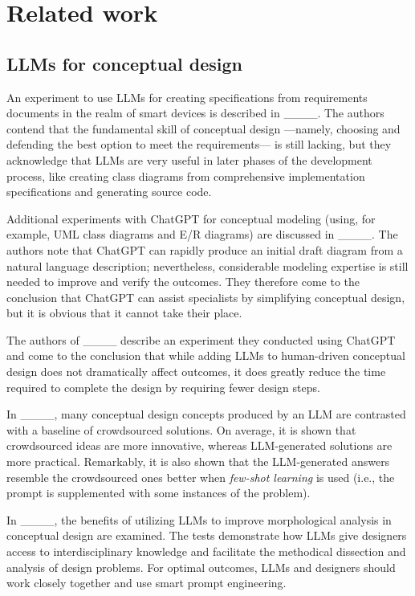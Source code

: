 \section{Related work}
\label{sec:rw}
\subsection{LLMs for conceptual design}

An experiment to use LLMs for creating specifications from requirements documents in the realm of smart devices is described in ____. The authors contend that the fundamental skill of conceptual design ---namely, choosing and defending the best option to meet the requirements--- is still lacking, but they acknowledge that LLMs are very useful in later phases of the development process, like creating class diagrams from comprehensive implementation specifications and generating source code. 

Additional experiments with ChatGPT for conceptual modeling (using, for example, UML class diagrams and E/R diagrams) are discussed in ____. 
The authors note that ChatGPT can rapidly produce an initial draft diagram from a natural language description; nevertheless, considerable modeling expertise is still needed to improve and verify the outcomes. They therefore come to the conclusion that ChatGPT can assist specialists by simplifying conceptual design, but it is obvious that it cannot take their place.

The authors of ____ describe an experiment they conducted using ChatGPT and come to the conclusion that while adding LLMs to human-driven conceptual design does not dramatically affect outcomes, it does greatly reduce the time required to complete the design by requiring fewer design steps.

In ____, many conceptual design concepts produced by an LLM are contrasted with a baseline of crowdsourced solutions. On average, it is shown that crowdsourced ideas are more innovative, whereas LLM-generated solutions are more practical. Remarkably, it is also shown that the LLM-generated answers resemble the crowdsourced ones better when \emph{few-shot learning} is used (i.e., the prompt is supplemented with some instances of the problem).

In ____, the benefits of utilizing LLMs to improve morphological analysis in conceptual design are examined. The tests demonstrate how LLMs give designers access to interdisciplinary knowledge and facilitate the methodical dissection and analysis of design problems. For optimal outcomes, LLMs and designers should work closely together and use smart prompt engineering.

